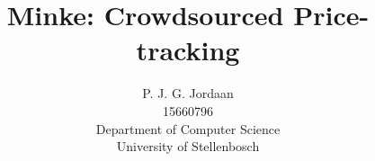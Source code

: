 \documentclass[10pt,a4paper]{article}
\author{P. J. G. Jordaan \\
15660796 \\
Department of Computer Science \\
University of Stellenbosch}
\title{Minke: Crowdsourced Price-tracking}
\date{}
\begin{document}
\maketitle
\pagebreak







\end{document}
